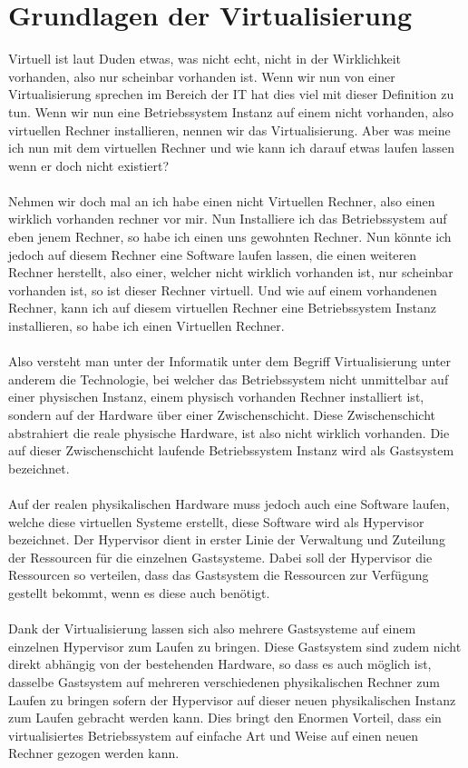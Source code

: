 \documentclass[14pt]{extreport}
\begin{document}
\section{Grundlagen der Virtualisierung}
Virtuell ist laut Duden etwas, was nicht echt, nicht in der Wirklichkeit vorhanden, also nur scheinbar vorhanden ist. Wenn wir nun von einer Virtualisierung sprechen im Bereich der IT hat dies viel mit dieser Definition zu tun. Wenn wir nun eine Betriebssystem Instanz auf einem nicht vorhanden, also virtuellen Rechner installieren, nennen wir das Virtualisierung. Aber was meine ich nun mit dem virtuellen Rechner und wie kann ich darauf etwas laufen lassen wenn er doch nicht existiert?\\
\\
Nehmen wir doch mal an ich habe einen nicht Virtuellen Rechner, also einen wirklich vorhanden rechner vor mir. Nun Installiere ich das Betriebssystem auf eben jenem Rechner, so habe ich einen uns gewohnten Rechner. Nun könnte ich jedoch auf diesem Rechner eine Software laufen lassen, die einen weiteren Rechner herstellt, also einer, welcher nicht wirklich vorhanden ist, nur scheinbar vorhanden ist, so ist dieser Rechner virtuell. Und wie auf einem vorhandenen Rechner, kann ich auf diesem virtuellen Rechner eine Betriebssystem Instanz installieren, so habe ich einen Virtuellen Rechner.\\
\\
Also versteht man unter der Informatik unter dem Begriff Virtualisierung unter anderem die Technologie, bei welcher das Betriebssystem nicht unmittelbar auf einer physischen Instanz, einem physisch vorhanden Rechner installiert ist, sondern auf der Hardware über einer Zwischenschicht. Diese Zwischenschicht abstrahiert die reale physische Hardware, ist also nicht wirklich vorhanden. Die auf dieser Zwischenschicht laufende Betriebssystem Instanz wird als Gastsystem bezeichnet. \\
\\
Auf der realen physikalischen Hardware muss jedoch auch eine Software laufen, welche diese virtuellen Systeme erstellt, diese Software wird als Hypervisor bezeichnet. Der Hypervisor dient in erster Linie der Verwaltung und Zuteilung der Ressourcen für die einzelnen Gastsysteme. Dabei soll der Hypervisor die Ressourcen so verteilen, dass das Gastsystem die Ressourcen zur Verfügung gestellt bekommt, wenn es diese auch benötigt.\\
\\
Dank der Virtualisierung lassen sich also mehrere Gastsysteme auf einem einzelnen Hypervisor zum Laufen zu bringen. Diese Gastsystem sind zudem nicht direkt abhängig von der bestehenden Hardware, so dass es auch möglich ist, dasselbe Gastsystem auf mehreren verschiedenen physikalischen Rechner zum Laufen zu bringen sofern der Hypervisor auf dieser neuen physikalischen Instanz zum Laufen gebracht werden kann. Dies bringt den Enormen Vorteil, dass ein virtualisiertes Betriebssystem auf einfache Art und Weise auf einen neuen Rechner gezogen werden kann. 
\end{document}
